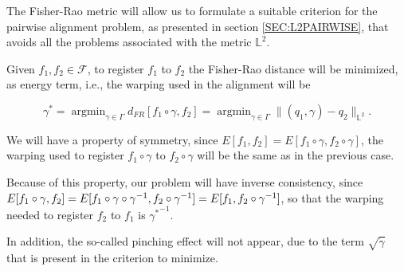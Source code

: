 
The Fisher-Rao metric will allow us to formulate a suitable criterion for the
pairwise alignment problem, as presented in section \ref{SEC:L2PAIRWISE},
 that avoids all the problems associated with the metric $\mathbb{L}^2$.

Given $f_1, f_2 \in \mathscr{F}$, to register $f_1$ to $f_2$ the Fisher-Rao distance
will be minimized, as energy term, i.e., the warping used in the alignment will be

$$
\gamma^{*}= \operatorname{argmin}_{\gamma \in \Gamma} d_{FR}[f_1 \circ \gamma,
f_2] = \operatorname{argmin}_{\gamma \in \Gamma} \|
(q_1, \gamma) - q_2 \|_{\mathbb{L}^2}.
$$

We will have a property of symmetry, since
$E[f_1, f_2] = E[f_1 \circ \gamma, f_2 \circ \gamma]$, the warping used to
register $f_1 \circ \gamma$ to $f_2 \circ \gamma$ will be the same as in the
previous case.

Because of this property, our problem will have inverse consistency, since
$E[f_1 \circ \gamma, f_2] = \\ E[f_1 \circ \gamma \circ \gamma^{-1}, f_2
\circ \gamma^{-1}] = E[f_1, f_2 \circ \gamma^{-1}]$, so that the
warping needed to register $f_2$ to $f_1$  is ${\gamma^*}^{-1}$.


In addition, the so-called pinching effect will not appear, due to the term
$\sqrt{\dot \gamma}$ that is present in the criterion to minimize.
